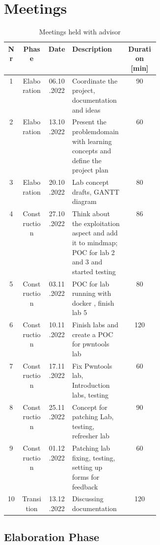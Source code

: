 \section*{Meetings}
\label{meeting_chapter}

\begin{table}[H]
    \centering
    \begin{tabular}{| c | c | c | p{0.36\linewidth} | c |}
        \hline 
        Nr & Phase & Date & Description & Duration [min]\\
        \hline \hline
        1 & Elaboration & 06.10.2022 & Coordinate the project, documentation \- and ideas & 90\\
        \hline
        2 & Elaboration & 13.10.2022 & Present the problemdomain with learning concepts and define the project plan & 60 \\
        \hline
        3 & Elaboration & 20.10.2022 & Lab concept drafts, GANTT diagram & 80 \\
        \hline
        4 & Construction & 27.10.2022 & Think about the exploitation aspect and add it to mindmap; POC for lab 2 and 3 and started testing & 86\\
        \hline
        5 & Construction & 03.11.2022 & POC for lab running with docker , finish lab 5 & 80 \\
        \hline
        6 & Construction & 10.11.2022 & Finish labs and create a POC for pwntools lab & 120 \\
        \hline
        7 & Construction & 17.11.2022 & Fix Pwntools lab, Introduction labs, testing & 60 \\
        \hline
        8 & Construction & 25.11.2022 & Concept for patching Lab, testing, refresher lab & 90 \\
        \hline
        9 & Construction & 01.12.2022 & Patching lab fixing, testing, setting up forms for feedback & 60 \\
        \hline
        10 & Transition & 13.12.2022 & Discussing documentation & 120 \\
        \hline
    \end{tabular}
    \caption{Meetings held with advisor}
    \label{meetings_hold_table}
\end{table}

\newpage
\subsection*{Elaboration Phase}

